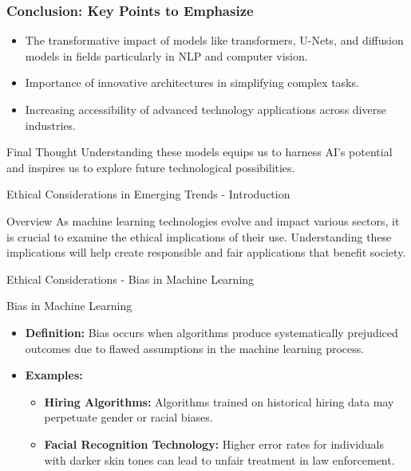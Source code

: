 \documentclass[aspectratio=169]{beamer}
\begin{document}
\begin{frame}[fragile]
    \frametitle{Conclusion: Key Points to Emphasize}
    \begin{itemize}
        \item The transformative impact of models like transformers, U-Nets, and diffusion models in fields particularly in NLP and computer vision.
        \item Importance of innovative architectures in simplifying complex tasks.
        \item Increasing accessibility of advanced technology applications across diverse industries.
    \end{itemize}
  
    \begin{block}{Final Thought}
        Understanding these models equips us to harness AI's potential and inspires us to explore future technological possibilities.
    \end{block}
\end{frame}

\begin{frame}[fragile]{Ethical Considerations in Emerging Trends - Introduction}
    \begin{block}{Overview}
        As machine learning technologies evolve and impact various sectors, it is crucial to examine the ethical implications of their use. Understanding these implications will help create responsible and fair applications that benefit society.
    \end{block}
\end{frame}

\begin{frame}[fragile]{Ethical Considerations - Bias in Machine Learning}
    \begin{block}{Bias in Machine Learning}
        \begin{itemize}
            \item \textbf{Definition:} Bias occurs when algorithms produce systematically prejudiced outcomes due to flawed assumptions in the machine learning process.
            \item \textbf{Examples:}
                \begin{itemize}
                    \item \textbf{Hiring Algorithms:} Algorithms trained on historical hiring data may perpetuate gender or racial biases.
                    \item \textbf{Facial Recognition Technology:} Higher error rates for individuals with darker skin tones can lead to unfair treatment in law enforcement.
                \end{itemize}
        \end{itemize}
    \end{block}
\end{frame}
\end{document}

